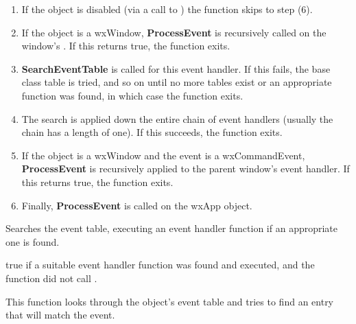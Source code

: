 \begin{enumerate}\itemsep=0pt
\item If the object is disabled (via a call to )
the function skips to step (6).
\item If the object is a wxWindow, {\bf ProcessEvent} is recursively called on the window's\rtfsp
{}. If this returns true, the function exits.
\item {\bf SearchEventTable} is called for this event handler. If this fails, the base
class table is tried, and so on until no more tables exist or an appropriate function was found,
in which case the function exits.
\item The search is applied down the entire chain of event handlers (usually the chain has a length
of one). If this succeeds, the function exits.
\item If the object is a wxWindow and the event is a wxCommandEvent, {\bf ProcessEvent} is
recursively applied to the parent window's event handler. If this returns true, the function exits.
\item Finally, {\bf ProcessEvent} is called on the wxApp object.
\end{enumerate}



\label{wxevthandlersearcheventtable}


Searches the event table, executing an event handler function if an appropriate one
is found.





true if a suitable event handler function was found and executed, and the function did not
call .


This function looks through the object's event table and tries to find an entry
that will match the event.

